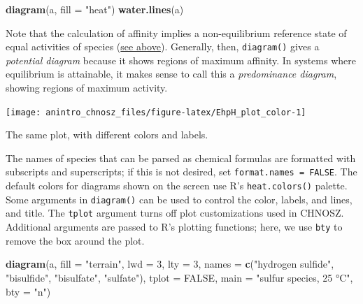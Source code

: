 \documentclass[]{tufte-book}
\newenvironment{Shaded}{}{}
\newcommand{\KeywordTok}[1]{\textcolor[rgb]{0.00,0.44,0.13}{\textbf{#1}}}
\newcommand{\DataTypeTok}[1]{\textcolor[rgb]{0.56,0.13,0.00}{#1}}
\newcommand{\DecValTok}[1]{\textcolor[rgb]{0.25,0.63,0.44}{#1}}
\newcommand{\StringTok}[1]{\textcolor[rgb]{0.25,0.44,0.63}{#1}}
\newcommand{\OtherTok}[1]{\textcolor[rgb]{0.00,0.44,0.13}{#1}}
\newcommand{\NormalTok}[1]{#1}
\begin{document}
\begin{Shaded}
\begin{Highlighting}[]
\KeywordTok{diagram}\NormalTok{(a, }\DataTypeTok{fill =} \StringTok{"heat"}\NormalTok{)}
\KeywordTok{water.lines}\NormalTok{(a)}
\end{Highlighting}
\end{Shaded}

Note that the calculation of affinity implies a non-equilibrium
reference state of equal activities of species
(\protect\hyperlink{species-of-interest}{see above}). Generally, then,
{\texttt{diagram()}} gives a \emph{potential diagram} because it shows
regions of maximum affinity. In systems where equilibrium is attainable,
it makes sense to call this a \emph{predominance diagram}, showing
regions of maximum activity.

\begin{marginfigure}
\texttt{[image: anintro\_chnosz\_files/figure-latex/EhpH\_plot\_color-1]} \caption[The same plot, with different colors and labels]{The same plot, with different colors and labels.}\label{fig:EhpH_plot_color}
\end{marginfigure}

The names of species that can be parsed as chemical formulas are
formatted with subscripts and superscripts; if this is not desired, set
\texttt{format.names\ =\ FALSE}. The default colors for diagrams shown
on the screen use R's \texttt{heat.colors()} palette. Some arguments in
{\texttt{diagram()}} can be used to control the color, labels, and
lines, and title. The \texttt{tplot} argument turns off plot
customizations used in CHNOSZ. Additional arguments are passed to R's
plotting functions; here, we use \texttt{bty} to remove the box around
the plot.

\begin{Shaded}
\begin{Highlighting}[]
\KeywordTok{diagram}\NormalTok{(a, }\DataTypeTok{fill =} \StringTok{"terrain"}\NormalTok{, }\DataTypeTok{lwd =} \DecValTok{3}\NormalTok{, }\DataTypeTok{lty =} \DecValTok{3}\NormalTok{,}
        \DataTypeTok{names =} \KeywordTok{c}\NormalTok{(}\StringTok{"hydrogen sulfide"}\NormalTok{, }\StringTok{"bisulfide"}\NormalTok{, }\StringTok{"bisulfate"}\NormalTok{, }\StringTok{"sulfate"}\NormalTok{),}
        \DataTypeTok{tplot =} \OtherTok{FALSE}\NormalTok{, }\DataTypeTok{main =} \StringTok{"sulfur species, 25 °C"}\NormalTok{, }\DataTypeTok{bty =} \StringTok{"n"}\NormalTok{)}
\end{Highlighting}
\end{Shaded}
\end{document}
